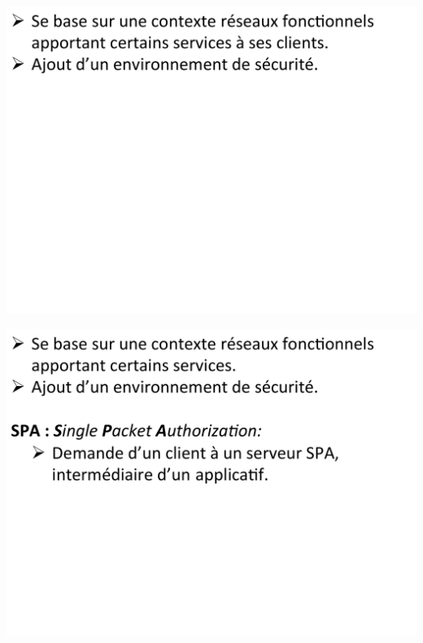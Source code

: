 \begin{frame}
\centerline{\includegraphics[scale=0.35]{slide1}}
\end{frame}

\begin{frame}[fragile]
\centerline{\includegraphics[scale=0.35]{slide2}}
\end{frame}

